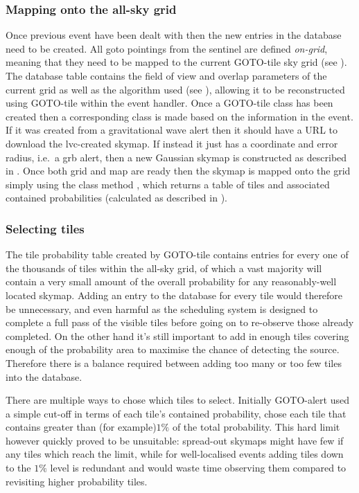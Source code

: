 \begin{colsection}
\begin{colsection}
\subsubsection{Mapping onto the all-sky grid}

Once previous event have been dealt with then the new entries in the database need to be created. All \gls{goto} pointings from the sentinel are defined \textit{on-grid}, meaning that they need to be mapped to the current GOTO-tile sky grid (see ). The database  table contains the field of view and overlap parameters of the current grid as well as the algorithm used (see ), allowing it to be reconstructed using GOTO-tile within the event handler. Once a GOTO-tile  class has been created then a corresponding  class is made based on the information in the event. If it was created from a gravitational wave alert then it should have a URL to download the \gls{lvc}-created skymap. If instead it just has a coordinate and error radius, i.e.\ a \gls{grb} alert, then a new Gaussian skymap is constructed as described in . Once both grid and map are ready then the skymap is mapped onto the grid simply using the class method , which returns a table of tiles and associated contained probabilities (calculated as described in ). %

\subsubsection{Selecting tiles}

The tile probability table created by GOTO-tile contains entries for every one of the thousands of tiles within the all-sky grid, of which a vast majority will contain a very small amount of the overall probability for any reasonably-well located skymap. Adding an entry to the database for every tile would therefore be unnecessary, and even harmful as the scheduling system is designed to complete a full pass of the visible tiles before going on to re-observe those already completed. On the other hand it's still important to add in enough tiles covering enough of the probability area to maximise the chance of detecting the source. Therefore there is a balance required between adding too many or too few tiles into the database.

There are multiple ways to chose which tiles to select. Initially GOTO-alert used a simple cut-off in terms of each tile's contained probability, chose each tile that contains greater than (for example)$1\%$ of the total probability. This hard limit however quickly proved to be unsuitable: spread-out skymaps might have few if any tiles which reach the limit, while for well-localised events adding tiles down to the $1\%$ level is redundant and would waste time observing them compared to revisiting higher probability tiles.


\end{colsection}
\end{colsection}
